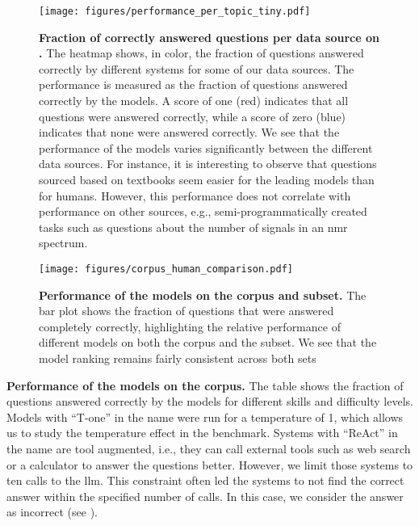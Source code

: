 \begin{figure}[htb]
    \centering
    \texttt{[image: figures/performance\_per\_topic\_tiny.pdf]}
    \caption{\textbf{Fraction of correctly answered questions per data source on \chembenchmini.} The heatmap shows, in color, the fraction of questions answered correctly by different systems for some of our data sources. The performance is measured as the fraction of questions answered correctly by the models. A score of one (red) indicates that all questions were answered correctly, while a score of zero (blue) indicates that none were answered correctly.
        We see that the performance of the models varies significantly between the different data sources. For instance, it is interesting to observe that questions sourced based on textbooks seem easier for the leading models than for humans. However, this performance does not correlate with performance on other sources, e.g., semi-programmatically created tasks such as questions about the number of signals in an \gls{nmr} spectrum.
    }
    \label{fig:performance_per_topic_tiny}
\end{figure}


\begin{figure}[htb]
    \centering
    \texttt{[image: figures/corpus\_human\_comparison.pdf]}
    \caption{\textbf{
        Performance of the models on the \chembench corpus and \chembenchmini subset.} The bar plot shows the fraction of questions that were answered completely correctly, highlighting the relative performance of different models on both the \chembench corpus and the \chembenchmini subset.
        We see that the model ranking remains fairly consistent across both sets}
    \label{fig:performance_corpus_and_tiny}
\end{figure}

\begin{table}
    \caption{\textbf{Performance of the models on the \chembench corpus.} The table shows the fraction of questions answered correctly by the models for different skills and difficulty levels. Models with \enquote{T-one} in the name were run for a temperature of 1, which allows us to study the temperature effect in the benchmark. Systems with \enquote{ReAct} in the name are tool augmented, i.e., they can call external tools such as web search or a calculator to answer the questions better. However, we limit those systems to ten calls to the \gls{llm}. This constraint often led the systems to not find the correct answer within the specified number of calls. In this case, we consider the answer as incorrect (see ).}
    \label{tab:performance_table}
\end{table}

